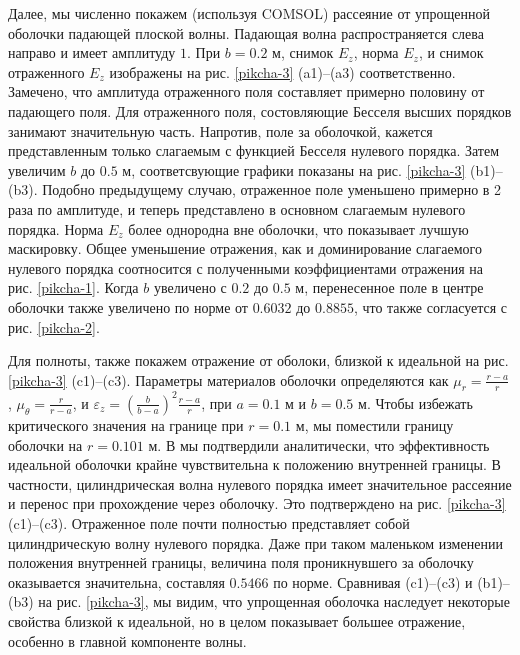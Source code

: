 \documentclass[12pt]{article}
\begin{document}
Далее, мы численно покажем (используя COMSOL) рассеяние от упрощенной
оболочки падающей плоской волны. Падающая волна распространяется слева
направо и имеет амплитуду $1$. При $b = 0.2$ м, снимок $E_z$, норма
$E_z$, и снимок отраженного $E_z$ изображены на рис. \ref{pikcha-3}
(a1)--(a3) соответственно. Замечено, что амплитуда отраженного поля
составляет примерно половину от падающего поля. Для отраженного поля,
состовляющие Бесселя высших порядков занимают значительную часть.
Напротив, поле за оболочкой, кажется представленным только слагаемым с
функцией Бесселя нулевого порядка. Затем увеличим $b$ до $0.5$ м,
соответсвующие графики показаны на рис. \ref{pikcha-3} (b1)--(b3).
Подобно предыдущему случаю, отраженное поле уменьшено примерно в 2
раза по амплитуде, и теперь представлено в основном слагаемым нулевого
порядка. Норма $E_z$ более однородна вне оболочки, что показывает
лучшую маскировку. Общее уменьшение отражения, как и доминирование
слагаемого нулевого порядка соотносится с полученными коэффициентами
отражения на рис. \ref{pikcha-1}. Когда $b$ увеличено с $0.2$ до $0.5$
м, перенесенное поле в центре оболочки также увеличено по норме от
$0.6032$ до $0.8855$, что также согласуется с рис. \ref{pikcha-2}.

Для полноты, также покажем отражение от оболоки, близкой к идеальной
на рис. \ref{pikcha-3} (c1)--(c3). Параметры материалов оболочки
определяются как $\mu_r = \frac{r - a}{r}$, $\mu_\theta = \frac{r}{r -
  a}$, и $\varepsilon_z = \left(\frac{b}{b - a}\right)^2 \frac{r -
  a}{r}$, при $a = 0.1$ м и $b = 0.5$ м. Чтобы избежать критического
значения на границе при $r = 0.1$ м, мы поместили границу оболочки на
$r = 0.101$ м. В \cite{11} мы подтвердили аналитически, что
эффективность идеальной оболочки крайне чувствительна к положению
внутренней границы. В частности, цилиндрическая волна нулевого порядка
имеет значительное рассеяние и перенос при прохождение через оболочку.
Это подтверждено на рис. \ref{pikcha-3} (c1)--(c3). Отраженное поле
почти полностью представляет собой цилиндрическую волну нулевого
порядка. Даже при таком маленьком изменении положения внутренней
границы, величина поля проникнувшего за оболочку оказывается
значительна, составляя $0.5466$ по норме. Сравнивая (c1)--(c3) и
(b1)--(b3) на рис. \ref{pikcha-3}, мы видим, что упрощенная оболочка
наследует некоторые свойства близкой к идеальной, но в целом
показывает большее отражение, особенно в главной компоненте волны.
\end{document}
